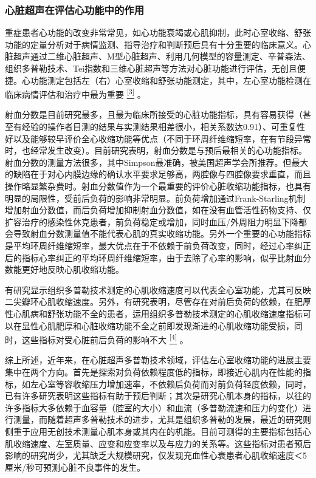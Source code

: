 \subsubsection{心脏超声在评估心功能中的作用}

重症患者心功能的改变非常常见，如心功能衰竭或心肌抑制，此时心室收缩、舒张功能的定量分析对于病情监测、指导治疗和判断预后具有十分重要的临床意义。心脏超声通过二维心脏超声、M型心脏超声、利用几何模型的容量测定、辛普森法、组织多普勒技术、Tei指数和三维心脏超声等方法对心脏功能进行评估，无创且便捷。心功能测定包括左（右）心室收缩和舒张功能测定，其中，左心室功能检测在临床病情评估和治疗中最为重要
\protect\hyperlink{text00009.htmlux5cux23ch3-8}{\textsuperscript{{[}3{]}}}
。

射血分数是目前研究最多，且最为临床所接受的心脏功能指标，具有容易获得（甚至有经验的操作者目测的结果与实测结果相差很小，相关系数达0.91）、可重复性好以及能够较早评价全心收缩功能等优点（不同于环周纤维缩短率，在有节段异常时，也经常发生改变）。目前研究表明，射血分数是与预后最相关的心功能指标。射血分数的测量方法很多，其中Simpson最准确，被美国超声学会所推荐。但最大的缺陷在于对心内膜边缘的确认水平要求足够高，两腔像与四腔像要求垂直，而且操作略显繁杂费时。射血分数值作为一个最重要的评价心脏收缩功能指标，也具有明显的局限性，受前后负荷的影响非常明显。前负荷增加通过Frank-Starling机制增加射血分数值，而后负荷增加抑制射血分数值，如在没有血管活性药物支持、仅扩容治疗的感染性休克患者，前负荷稳定或增加，同时血压/外周阻力明显下降都会导致射血分数测量值不能代表心肌的真实收缩功能。另外一个重要的心功能指标是平均环周纤维缩短率，最大优点在于不依赖于前负荷改变，同时，经过心率纠正后的指标心率纠正的平均环周纤维缩短率，由于去除了心率的影响，似乎比射血分数能更好地反映心肌收缩功能。

有研究显示组织多普勒技术测定的心肌收缩速度可以代表全心室功能，尤其可反映二尖瓣环心肌收缩速度。另外，有研究表明，尽管存在对前后负荷的依赖，在肥厚性心肌病和舒张功能不全的患者，运用组织多普勒技术测定的心肌收缩速度指标可以在显性心肌肥厚和心脏收缩功能不全之前即发现渐进的心肌收缩功能受损，同时，这些指标对受心脏前后负荷的影响不大
\protect\hyperlink{text00009.htmlux5cux23ch4-8}{\textsuperscript{{[}4{]}}}
。

综上所述，近年来，在心脏超声多普勒技术领域，评估左心室收缩功能的进展主要集中在两个方向。首先是探索对负荷依赖程度低的指标，即接近心肌内在性能的指标，如左心室等容收缩压力增加速率，不依赖后负荷而对前负荷轻度依赖，同时，已有许多研究表明这些指标有助于预后判断；其次是研究心肌本身的指标，以往的许多指标大多依赖于血容量（腔室的大小）和血流（多普勒流速和压力的变化）进行测量，而随着超声多普勒技术的进步，尤其是组织多普勒的发展，最近的研究则侧重于应用无创技术测量心肌本身或其内在的机能。目前可测得的主要指标包括心肌收缩速度、左室质量、应变和应变率以及与应力的关系等。这些指标对患者预后影响的研究尚少，尤其缺乏大规模研究，仅发现充血性心衰患者心肌收缩速度＜5厘米/秒可预测心脏不良事件的发生。

